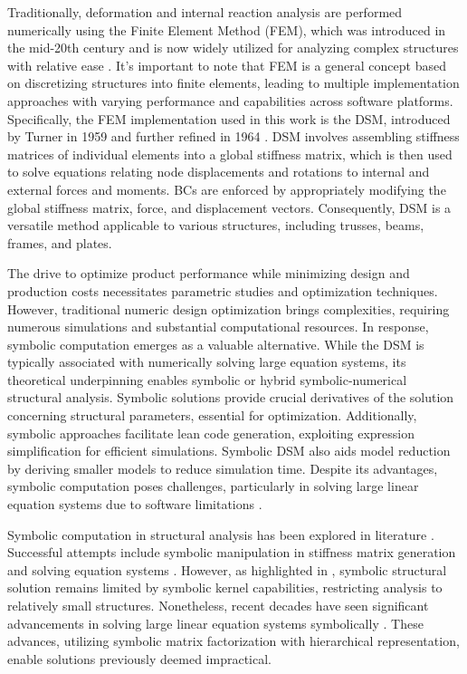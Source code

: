 Traditionally, deformation and internal reaction analysis are performed numerically using the Finite Element Method (\ac{FEM}), which was introduced in the mid-20th century and is now widely utilized for analyzing complex structures with relative ease \cite{felippa2001historical}. It's important to note that \ac{FEM} is a general concept based on discretizing structures into finite elements, leading to multiple implementation approaches with varying performance and capabilities across software platforms. Specifically, the \ac{FEM} implementation used in this work is the \ac{DSM}, introduced by Turner in 1959 \cite{turner1959direct} and further refined in 1964 \cite{turner1964further}. DSM involves assembling stiffness matrices of individual elements into a global stiffness matrix, which is then used to solve equations relating node displacements and rotations to internal and external forces and moments. \acp{BC} are enforced by appropriately modifying the global stiffness matrix, force, and displacement vectors. Consequently, DSM is a versatile method applicable to various structures, including trusses, beams, frames, and plates.

The drive to optimize product performance while minimizing design and production costs necessitates parametric studies and optimization techniques. However, traditional numeric design optimization brings complexities, requiring numerous simulations and substantial computational resources. In response, symbolic computation emerges as a valuable alternative. While the \ac{DSM} is typically associated with numerically solving large equation systems, its theoretical underpinning enables symbolic or hybrid symbolic-numerical structural analysis. Symbolic solutions provide crucial derivatives of the solution concerning structural parameters, essential for optimization. Additionally, symbolic approaches facilitate lean code generation, exploiting expression simplification for efficient simulations. Symbolic \ac{DSM} also aids model reduction by deriving smaller models to reduce simulation time. Despite its advantages, symbolic computation poses challenges, particularly in solving large linear equation systems due to software limitations \cite{carette2006linear, zhou2007symbolic}.

Symbolic computation in structural analysis has been explored in literature \cite{noor1979computerized, pavlovic2003symbolic}. Successful attempts include symbolic manipulation in stiffness matrix generation \cite{cecchi1977automatic} and solving equation systems \cite{ioakimidis1992application, beltzer2012variational}. However, as highlighted in \cite{pavlovic2003symbolic}, symbolic structural solution remains limited by symbolic kernel capabilities, restricting analysis to relatively small structures. Nonetheless, recent decades have seen significant advancements in solving large linear equation systems symbolically \cite{carette2006linear, zhou2007symbolic}. These advances, utilizing symbolic matrix factorization with hierarchical representation, enable solutions previously deemed impractical.

